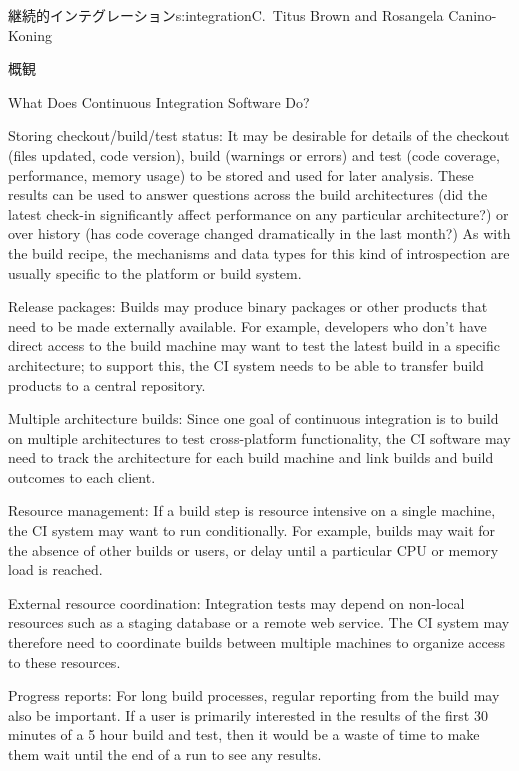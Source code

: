 \begin{aosachapter}{継続的インテグレーション}{s:integration}{C.\ Titus Brown and Rosangela Canino-Koning}
\begin{aosasect1}{概観}
\begin{aosasect2}{What Does Continuous Integration Software Do?}
\begin{aosadescription}
  \item{Storing checkout/build/test status:} It may be desirable
  for details of the checkout (files updated, code version), build
  (warnings or errors) and test (code coverage, performance, memory
  usage) to be stored and used for later analysis. These results can
  be used to answer questions across the build architectures (did
  the latest check-in significantly affect performance on any
  particular architecture?) or over history (has code coverage
  changed dramatically in the last month?) As with the build recipe,
  the mechanisms and data types for this kind of introspection are
  usually specific to the platform or build system.

  \item{Release packages:} Builds may produce binary packages or
  other products that need to be made externally available. For
  example, developers who don't have direct access to the build
  machine may want to test the latest build in a specific
  architecture; to support this, the CI system needs to be able to
  transfer build products to a central repository.
  
  \item{Multiple architecture builds:} Since one goal
  of continuous integration is to build on multiple architectures to
  test cross-platform functionality, the CI software may need to
  track the architecture for each build machine and link
  builds and build outcomes to each client.

  \item{Resource management:} If a build step is resource
  intensive on a single machine, the CI system may want to run
  conditionally. For example, builds may wait for the absence of
  other builds or users, or delay until a particular CPU or memory
  load is reached.

  \item{External resource coordination:} Integration tests may
  depend on non-local resources such as a staging database or a
  remote web service. The CI system may therefore need to coordinate
  builds between multiple machines to organize access to these
  resources.

  \item{Progress reports:} For long build processes, regular
  reporting from the build may also be important. If a user is
  primarily interested in the results of the first 30 minutes of a 5
  hour build and test, then it would be a waste of time to make them
  wait until the end of a run to see any results.


\end{aosadescription}
\end{aosasect2}
\end{aosasect1}
\end{aosachapter}
